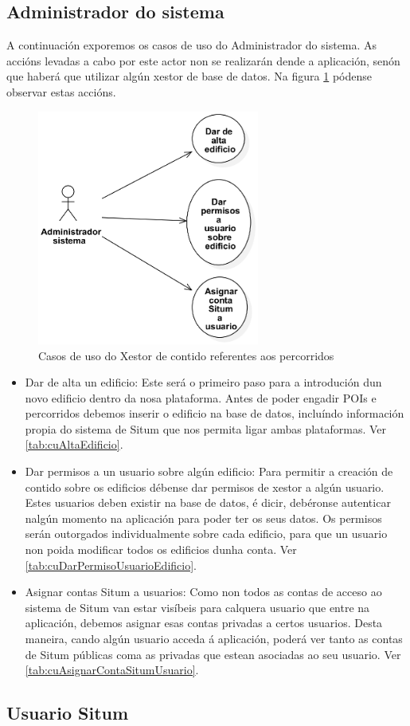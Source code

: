 \subsection{Administrador do sistema}
A continuación exporemos os casos de uso do Administrador do sistema. As accións levadas a cabo por este actor non se realizarán dende a aplicación, senón que haberá que utilizar algún xestor de base de datos. Na figura \ref{fig:cuAdministradorSistema} pódense observar estas accións.

\begin{figure}[tbp]
	\begin{center}
		\includegraphics[width=0.65\textwidth]{figures/CasosUso/AdministradorSistema}
		\caption{Casos de uso do Xestor de contido referentes aos percorridos}
		\label{fig:cuAdministradorSistema}
	\end{center}
\end{figure}

\begin{itemize}
	\item Dar de alta un edificio: Este será o primeiro paso para a introdución dun novo edificio dentro da nosa plataforma. Antes de poder engadir POIs e percorridos debemos inserir o edificio na base de datos, incluíndo información propia do sistema de Situm que nos permita ligar ambas plataformas. Ver \ref{tab:cuAltaEdificio}.
	\item Dar permisos a un usuario sobre algún edificio: Para permitir a creación de contido sobre os edificios débense dar permisos de xestor a algún usuario. Estes usuarios deben existir na base de datos, é dicir, debéronse autenticar nalgún momento na aplicación para poder ter os seus datos. Os permisos serán outorgados individualmente sobre cada edificio, para que un usuario non poida modificar todos os edificios dunha conta. Ver \ref{tab:cuDarPermisoUsuarioEdificio}.
	\item Asignar contas Situm a usuarios: Como non todos as contas de acceso ao sistema de Situm van estar visíbeis para calquera usuario que entre na aplicación, debemos asignar esas contas privadas a certos usuarios. Desta maneira, cando algún usuario acceda á aplicación, poderá ver tanto as contas de Situm públicas coma as privadas que estean asociadas ao seu usuario. Ver \ref{tab:cuAsignarContaSitumUsuario}.
\end{itemize}


\subsection{Usuario Situm}